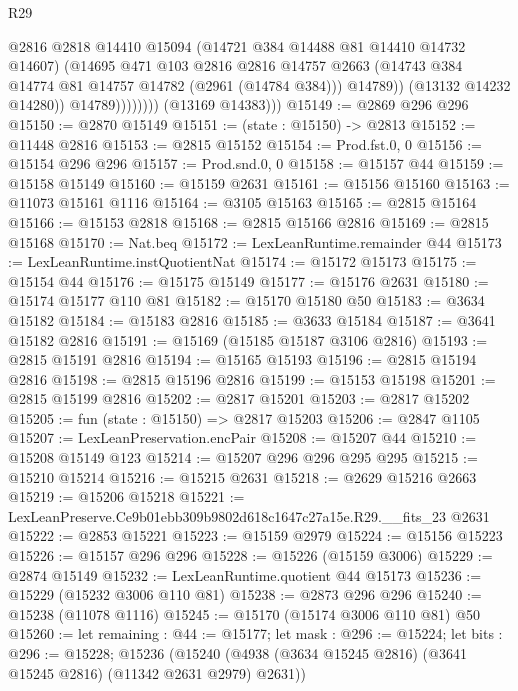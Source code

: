 \begin{lexlean}{R29}
\begin{coremodule}
                            @2816
                            @2818
                            @14410
                            @15094
                            (@14721 @384 @14488 @81 @14410 @14732 @14607)
                            (@14695
                              @471
                              @103
                              @2816
                              @2816
                              @14757
                              @2663
                              (@14743 @384 @14774 @81 @14757 @14782 (@2961 (@14784 @384)))
                              @14789))
                          (@13132 @14232 @14280))
                        @14789))))))))
        (@13169 @14383)))
@15149 := @2869 @296 @296
@15150 := @2870 @15149
@15151 := (state : @15150) -> @2813
@15152 := @11448 @2816
@15153 := @2815 @15152
@15154 := Prod.fst.{0, 0}
@15156 := @15154 @296 @296
@15157 := Prod.snd.{0, 0}
@15158 := @15157 @44
@15159 := @15158 @15149
@15160 := @15159 @2631
@15161 := @15156 @15160
@15163 := @11073 @15161 @1116
@15164 := @3105 @15163
@15165 := @2815 @15164
@15166 := @15153 @2818
@15168 := @2815 @15166 @2816
@15169 := @2815 @15168
@15170 := Nat.beq
@15172 := LexLeanRuntime.remainder @44
@15173 := LexLeanRuntime.instQuotientNat
@15174 := @15172 @15173
@15175 := @15154 @44
@15176 := @15175 @15149
@15177 := @15176 @2631
@15180 := @15174 @15177 @110 @81
@15182 := @15170 @15180 @50
@15183 := @3634 @15182
@15184 := @15183 @2816
@15185 := @3633 @15184
@15187 := @3641 @15182 @2816
@15191 := @15169 (@15185 @15187 @3106 @2816)
@15193 := @2815 @15191 @2816
@15194 := @15165 @15193
@15196 := @2815 @15194 @2816
@15198 := @2815 @15196 @2816
@15199 := @15153 @15198
@15201 := @2815 @15199 @2816
@15202 := @2817 @15201
@15203 := @2817 @15202
@15205 := fun (state : @15150) => @2817 @15203
@15206 := @2847 @1105
@15207 := LexLeanPreservation.encPair
@15208 := @15207 @44
@15210 := @15208 @15149 @123
@15214 := @15207 @296 @296 @295 @295
@15215 := @15210 @15214
@15216 := @15215 @2631
@15218 := @2629 @15216 @2663
@15219 := @15206 @15218
@15221 := LexLeanPreserve.Ce9b01ebb309b9802d618c1647c27a15e.R29.__fits_23 @2631
@15222 := @2853 @15221
@15223 := @15159 @2979
@15224 := @15156 @15223
@15226 := @15157 @296 @296
@15228 := @15226 (@15159 @3006)
@15229 := @2874 @15149
@15232 := LexLeanRuntime.quotient @44 @15173
@15236 := @15229 (@15232 @3006 @110 @81)
@15238 := @2873 @296 @296
@15240 := @15238 (@11078 @1116)
@15245 := @15170 (@15174 @3006 @110 @81) @50
@15260 := let remaining : @44 := @15177;
  let mask : @296 := @15224;
  let bits : @296 := @15228;
  @15236 (@15240 (@4938 (@3634 @15245 @2816) (@3641 @15245 @2816) (@11342 @2631 @2979) @2631))

\end{coremodule}
\end{lexlean}

